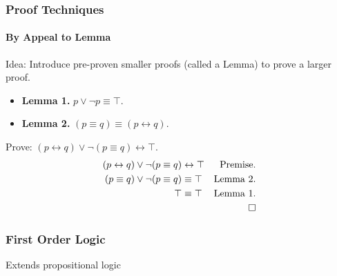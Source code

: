 \documentclass{beamer}
\begin{document}
\begin{frame}[fragile]
  \frametitle{Proof Techniques}
  \framesubtitle{By Appeal to Lemma}
  Idea: Introduce pre-proven smaller proofs (called a Lemma) to prove a larger
        proof. \\
  \begin{itemize}
    \item \textbf{Lemma 1.} $p \lor \lnot p \equiv \top$. \\
    \item \textbf{Lemma 2.} $(p \equiv q) \equiv (p \leftrightarrow q)$. 
  \end{itemize} 
  Prove: $(p \leftrightarrow q) \lor \lnot (p \equiv q) \leftrightarrow \top$.
  \begin{align*}
    (p \leftrightarrow q) \lor \lnot (p \equiv q) &\leftrightarrow \top
          &\text{Premise.} \\
    (p \equiv q) \lor \lnot (p \equiv q) &\equiv \top
          &\text{Lemma 2.} \\
    \top &\equiv \top &\text{Lemma 1.} \\
    & &\qed
  \end{align*}
\end{frame}

\begin{frame}
  \frametitle{First Order Logic}
  Extends propositional logic 
\end{frame}
  
\end{document}
